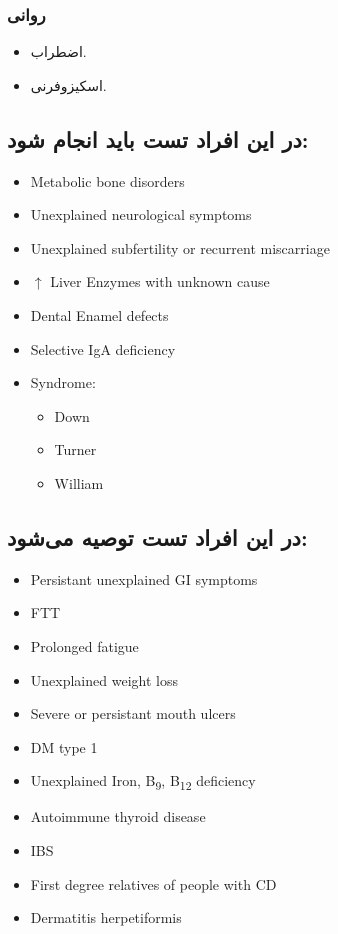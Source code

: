 \documentclass[12pt,a4paper]{article}
\begin{document}
\subsubsection*{ روانی}
\begin{itemize}
\item اضطراب.
\item اسکیزوفرنی.
\end{itemize}

\subsection*{در این افراد تست  باید انجام شود:}
\begin{latin}
\begin{itemize}
\item Metabolic bone disorders
\item Unexplained neurological symptoms
\item Unexplained subfertility or recurrent miscarriage
\item \(\uparrow\) Liver Enzymes with unknown cause
\item Dental Enamel defects
\item Selective IgA deficiency
\item Syndrome:
  \begin{itemize}
  \item Down
  \item Turner
  \item William
  \end{itemize}
\end{itemize}
\end{latin}

\subsection*{در این افراد تست  توصیه می‌شود:}
\begin{latin}
\begin{itemize}
\item Persistant unexplained GI symptoms
\item FTT
\item Prolonged fatigue
\item Unexplained weight loss
\item Severe or persistant mouth ulcers
\item DM type 1
\item Unexplained Iron, B\textsubscript{9}, B\textsubscript{12} deficiency
\item Autoimmune thyroid disease
\item IBS
\item First degree relatives of people with CD
\item Dermatitis herpetiformis
\end{itemize}
\end{latin}
\end{document}
